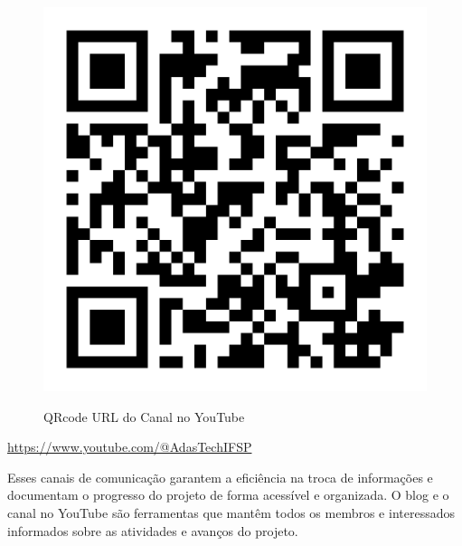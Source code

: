 \begin{figure}[ht]
        \centering
        \href{https://www.youtube.com/@AdasTechIFSP}{
        \includegraphics[scale=0.5]{images/qrCode-yotube.png}
        }        
        \caption{QRcode URL do Canal no YouTube}
        \label{fig:qrCodeYoutube}
    \end{figure}
    \href{https://www.youtube.com/@AdasTechIFSP}{https://www.youtube.com/@AdasTechIFSP}


    Esses canais de comunicação garantem a eficiência na troca de informações e documentam o progresso do projeto de forma acessível e organizada. O blog e o canal no YouTube são ferramentas que mantêm todos os membros e interessados informados sobre as atividades e avanços do projeto.